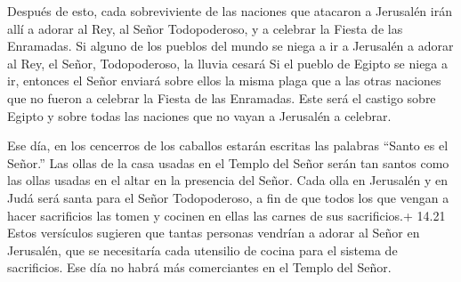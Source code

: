 Después de esto, cada sobreviviente de las naciones que
atacaron a Jerusalén irán allí a adorar al Rey, al Señor Todopoderoso, y
a celebrar la Fiesta de las Enramadas.  Si alguno de los
pueblos del mundo se niega a ir a Jerusalén a adorar al Rey, el Señor,
Todopoderoso, la lluvia cesará  Si el pueblo de Egipto se
niega a ir, entonces el Señor enviará sobre ellos la misma plaga que a
las otras naciones que no fueron a celebrar la Fiesta de las Enramadas.
 Este será el castigo sobre Egipto y sobre todas las
naciones que no vayan a Jerusalén a celebrar.

 Ese día, en los cencerros de los caballos estarán escritas
las palabras ``Santo es el Señor.'' Las ollas de la casa usadas en el
Templo del Señor serán tan santos como las ollas usadas en el altar en
la presencia del Señor.  Cada olla en Jerusalén y en Judá
será santa para el Señor Todopoderoso, a fin de que todos los que vengan
a hacer sacrificios las tomen y cocinen en ellas las carnes de sus
sacrificios.+ 14.21 Estos versículos sugieren que tantas personas
vendrían a adorar al Señor en Jerusalén, que se necesitaría cada
utensilio de cocina para el sistema de sacrificios. Ese día no habrá más
comerciantes en el Templo del Señor.

